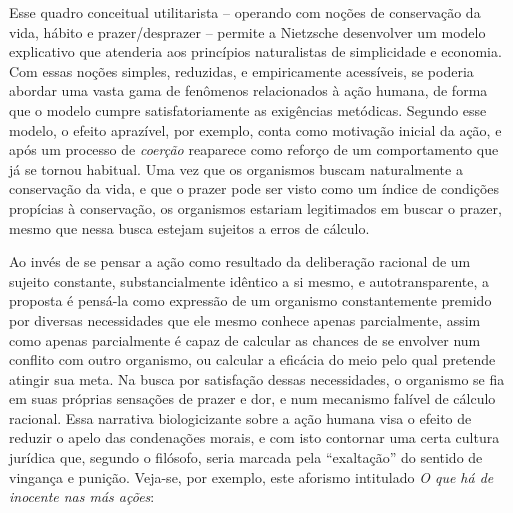 \documentclass[
	12pt,				%
	openright,			%
	oneside,			%
	a4paper,			%
	english,			%
	french,				%
	spanish,			%
	brazil				%
	]{abntex2}
\begin{document}
Esse quadro conceitual utilitarista – operando com noções de conservação da vida, hábito e prazer/desprazer – permite a Nietzsche desenvolver um modelo explicativo que atenderia aos princípios naturalistas de simplicidade e economia. Com essas noções simples, reduzidas, e empiricamente acessíveis, se poderia abordar uma vasta gama de fenômenos relacionados à ação humana, de forma que o modelo cumpre satisfatoriamente as exigências metódicas. Segundo esse modelo, o efeito aprazível, por exemplo, conta como motivação inicial da ação, e após um processo de \textit{coerção} reaparece como reforço de um comportamento que já se tornou habitual. Uma vez que os organismos buscam naturalmente a conservação da vida, e que o prazer pode ser visto como um índice de condições propícias à conservação, os organismos estariam legitimados em buscar o prazer, mesmo que nessa busca estejam sujeitos a erros de cálculo.

	Ao invés de se pensar a ação como resultado da deliberação racional de um sujeito constante, substancialmente idêntico a si mesmo, e autotransparente, a proposta é pensá-la como expressão de um organismo constantemente premido por diversas necessidades que ele mesmo conhece apenas parcialmente, assim como apenas parcialmente é capaz de calcular as chances de se envolver num conflito com outro organismo, ou calcular a eficácia do meio pelo qual pretende atingir sua meta. Na busca por satisfação dessas necessidades, o organismo se fia em suas próprias sensações de prazer e dor, e num mecanismo falível de cálculo racional. Essa narrativa biologicizante sobre a ação humana visa o efeito de reduzir o apelo das condenações morais, e com isto contornar uma certa cultura jurídica que, segundo o filósofo, seria marcada pela “exaltação” do sentido de vingança e punição. Veja-se, por exemplo, este aforismo intitulado \textit{O que há de inocente nas más ações}:
	
\end{document}
